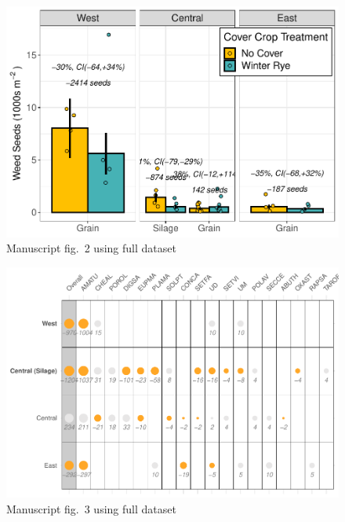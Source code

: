 \documentclass[]{article}
\begin{document}
\begin{figure}
\centering
\includegraphics{supp-mat_files/figure-latex/bargraph-1.pdf}
\caption{Manuscript fig.~2 using full dataset}
\end{figure}

\begin{figure}
\centering
\includegraphics{supp-mat_files/figure-latex/dotplot-1.pdf}
\caption{Manuscript fig.~3 using full dataset}
\end{figure}

\newpage
\end{document}
